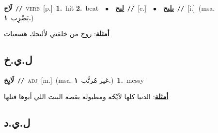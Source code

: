 \documentclass[10pt,a4paper,twoside]{article} %
\begin{document}
\begin{multicols}{2}
{\setlength\topsep{0pt}\textbf{\foreignlanguage{arabic}{لَاح}}\ {\color{gray}\texttt{//}\color{black}}\ \textsc{verb}\ [p.]\ \textbf{1.}~hit  \textbf{2.}~beat\ \ $\bullet$\ \ \setlength\topsep{0pt}\textbf{\foreignlanguage{arabic}{لِيح}}\ {\color{gray}\texttt{//}\color{black}}\ [c.]\ \ $\bullet$\ \ \setlength\topsep{0pt}\textbf{\foreignlanguage{arabic}{يلِيح}}\ {\color{gray}\texttt{//}\color{black}}\ [i.]\ \color{gray}(msa. \foreignlanguage{arabic}{يَضْرِب}~\foreignlanguage{arabic}{\textbf{١.}})\color{black}\  \begin{flushright}\color{gray}\foreignlanguage{arabic}{\textbf{\underline{\foreignlanguage{arabic}{أمثلة}}}: روح من خلقتي لأليحك هسعيات}\end{flushright}\color{black}} \vspace{2mm}

\vspace{-3mm}
\subsection*{\color{blue}\foreignlanguage{arabic}{ل.ي.خ}\color{blue}{}} 

{\setlength\topsep{0pt}\textbf{\foreignlanguage{arabic}{لَايِخ}}\ {\color{gray}\texttt{//}\color{black}}\ \textsc{adj}\ [m.]\ \color{gray}(msa. \foreignlanguage{arabic}{غير مُرتَّب}~\foreignlanguage{arabic}{\textbf{١.}})\color{black}\ \textbf{1.}~messy\  \begin{flushright}\color{gray}\foreignlanguage{arabic}{\textbf{\underline{\foreignlanguage{arabic}{أمثلة}}}: الدنيا كلها لاَيْخَة ومطبولة بقصة البنت اللي أبوها قتلها}\end{flushright}\color{black}} \vspace{2mm}

\vspace{-3mm}
\subsection*{\color{blue}\foreignlanguage{arabic}{ل.ي.د}\color{blue}{}} 


\end{multicols}
\end{document}
